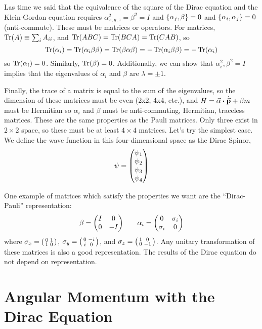 \documentclass[a4paper,twoside,master.tex]{subfiles}
\begin{document}

Las time we said that the equivalence of the square of the Dirac equation and the Klein-Gordon equation requires $ \alpha_{x,y,z}^2 = \beta^2 = I $ and $ \pb{\alpha_j}{\beta} = 0 $ and $ \pb{\alpha_i}{\alpha_j} = 0 $ (anti-commute). These must be matrices or operators. For matrices, $ \Tr(A) \equiv \sum_i A_{ii} $, and $ \Tr(ABC) = \Tr(BCA) = \Tr(CAB) $, so
\begin{equation}
    \Tr(\alpha_i) = \Tr(\alpha_i \beta \beta) = \Tr(\beta \alpha \beta) = - \Tr(\alpha_i \beta \beta) = - \Tr(\alpha_i)
\end{equation}
so $ \Tr(\alpha_i) = 0 $. Similarly, $ \Tr(\beta) = 0 $. Additionally, we can show that $ \alpha_i^2, \beta^2 = I $ implies that the eigenvalues of $ \alpha_i $ and $ \beta $ are $ \lambda = \pm 1 $. 

Finally, the trace of a matrix is equal to the sum of the eigenvalues, so the dimension of these matrices must be even (2x2, 4x4, etc.), and $ H = \va{\alpha} \vdot \hat{\va{p}} + \beta m $ must be Hermitian so $ \alpha_i $ and $ \beta $ must be anti-commuting, Hermitian, traceless matrices. These are the same properties as the Pauli matrices. Only three exist in $ 2 \times 2 $ space, so these must be at least $ 4 \times 4 $ matrices. Let's try the simplest case. We define the wave function in this four-dimensional space as the Dirac Spinor,
\begin{equation}
    \psi = \mqty(\psi_1\\ \psi_2\\ \psi_3\\ \psi_4)
\end{equation}

One example of matrices which satisfy the properties we want are the ``Dirac-Pauli'' representation:
\begin{equation}
    \beta = \mqty(I&0\\0& -I) \qquad \alpha_i = \mqty(0& \sigma_i \\ \sigma_i & 0)
\end{equation}
where $ \sigma_x = \smqty(\pmat{1}) $, $ \sigma_y = \smqty(\pmat{2}) $, and $ \sigma_z = \smqty(\pmat{3}) $. Any unitary transformation of these matrices is also a good representation. The results of the Dirac equation do not depend on representation.

\section{Angular Momentum with the Dirac Equation}\label{sec:angular_momentum_with_the_dirac_equation}
\end{document}
